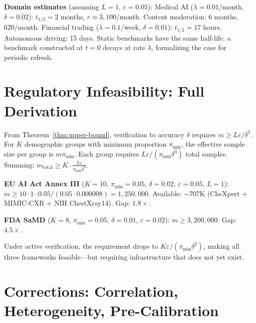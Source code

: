 \documentclass{article}
\newcommand{\Lip}{L}
\newcommand{\errrate}{\varepsilon}
\newcommand{\nsamples}{m}
\newcommand{\groupprop}{\pi}
\newcommand{\targetacc}{\delta}
\newcommand{\halflife}{t_{1/2}}
\newcommand{\driftrate}{\lambda}
\newcommand{\datrate}{r}
\theoremstyle{definition}
\begin{document}
\textbf{Domain estimates} (assuming $\Lip = 1$, $\errrate = 0.05$): Medical AI ($\driftrate = 0.01$/month, $\targetacc = 0.02$): $\halflife = 2$ months, $\datrate \approx 3{,}100$/month. Content moderation: 6 months, 620/month. Financial trading ($\driftrate = 0.1$/week, $\targetacc = 0.01$): $\halflife = 17$ hours. Autonomous driving: 15 days. Static benchmarks have the same half-life: a benchmark constructed at $t = 0$ decays at rate $\driftrate$, formalizing the case for periodic refresh.

\section{Regulatory Infeasibility: Full Derivation}
\label{app:regulatory}

From Theorem~\ref{thm:upper-bound}, verification to accuracy $\targetacc$ requires $\nsamples \geq \Lip\errrate/\targetacc^3$. For $K$ demographic groups with minimum proportion $\groupprop_{\min}$, the effective sample size per group is $\nsamples\groupprop_{\min}$. Each group requires $\Lip\errrate/(\groupprop_{\min}\targetacc^3)$ total samples. Summing:
$\nsamples_{\mathrm{total}} \geq K \cdot \frac{\Lip\errrate}{\groupprop_{\min}\targetacc^3}$.

\textbf{EU AI Act Annex III} ($K{=}10$, $\groupprop_{\min}{=}0.05$, $\targetacc{=}0.02$, $\errrate{=}0.05$, $\Lip{=}1$): $\nsamples \geq 10 \cdot 1 \cdot 0.05 / (0.05 \cdot 0.000008) = 1{,}250{,}000$. Available: $\sim$707K (CheXpert + MIMIC-CXR + NIH ChestXray14). Gap: $1.8\times$.

\textbf{FDA SaMD} ($K{=}8$, $\groupprop_{\min}{=}0.05$, $\targetacc{=}0.01$, $\errrate{=}0.02$): $\nsamples \geq 3{,}200{,}000$. Gap: $4.5\times$.

Under active verification, the requirement drops to $K\errrate/(\groupprop_{\min}\targetacc^2)$, making all three frameworks feasible---but requiring infrastructure that does not yet exist.

\section{Corrections: Correlation, Heterogeneity, Pre-Calibration}
\label{app:corrections}
\end{document}
